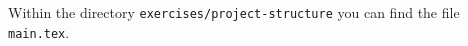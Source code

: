 Within the directory \texttt{exercises/project-structure} you can find the file 
\texttt{main.tex}.


